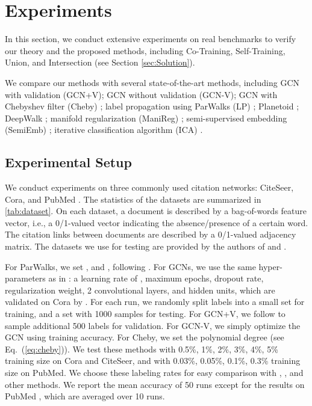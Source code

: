 \documentclass[letterpaper]{article} \usepackage{aaai18}  \usepackage{times}  \usepackage{helvet}  \usepackage{courier}  \usepackage{url}  \usepackage{graphicx}  \usepackage{algorithm}
\begin{document}
\section{Experiments}\label{sec:Experiment}

In this section, we conduct extensive experiments on real benchmarks to verify our theory and the proposed methods, including Co-Training, Self-Training, Union, and Intersection (see Section \ref{sec:Solution}).








We compare our methods with several state-of-the-art methods, including
GCN with validation (GCN+V); GCN without validation (GCN-V); GCN with Chebyshev filter (Cheby) \cite{kipf2016semi}; label propagation using ParWalks (LP) \cite{Wu12parw}; Planetoid \cite{yang2016revisiting}; DeepWalk \cite{perozzi2014deepwalk}; manifold regularization (ManiReg) \cite{belkin2006manifold}; semi-supervised embedding (SemiEmb) \cite{weston2012deep}; iterative classification algorithm (ICA) \cite{sen2008collective}.

\subsection{Experimental Setup}

We conduct experiments on three commonly used citation networks: CiteSeer, Cora, and PubMed \cite{sen2008collective}. The statistics of the datasets are summarized in \tablename\;\ref{tab:dataset}. On each dataset, a document is described by a bag-of-words feature vector, i.e., a 0/1-valued vector indicating the absence/presence of a certain word. The citation links between documents are described by a 0/1-valued adjacency matrix. The datasets we use for testing are provided by the authors of \cite{yang2016revisiting} and \cite{kipf2016semi}.




For ParWalks, we set , and , following \citeauthor{Wu12parw}. For GCNs, we use the same hyper-parameters as in \cite{kipf2016semi}: a learning rate of ,  maximum epochs,  dropout rate,   regularization weight, 2 convolutional layers, and  hidden units, which are validated on Cora by \citeauthor{kipf2016semi}. For each run, we randomly split labels into a small set for training, and a set with 1000 samples for testing. For GCN+V, we follow \cite{kipf2016semi} to sample additional 500 labels for validation. For GCN-V, we simply optimize the GCN using training accuracy. For Cheby, we set the polynomial degree  (see Eq.~(\ref{eq:cheby})). We test these methods with 0.5\%, 1\%, 2\%, 3\%, 4\%, 5\% training size on Cora and CiteSeer, and with 0.03\%, 0.05\%, 0.1\%, 0.3\% training size on PubMed. We choose these labeling rates for easy comparison with \cite{kipf2016semi}, \cite{yang2016revisiting}, and other methods. We report the mean accuracy of 50 runs except for the results on PubMed \cite{yang2016revisiting}, which are averaged over 10 runs.
\end{document}
